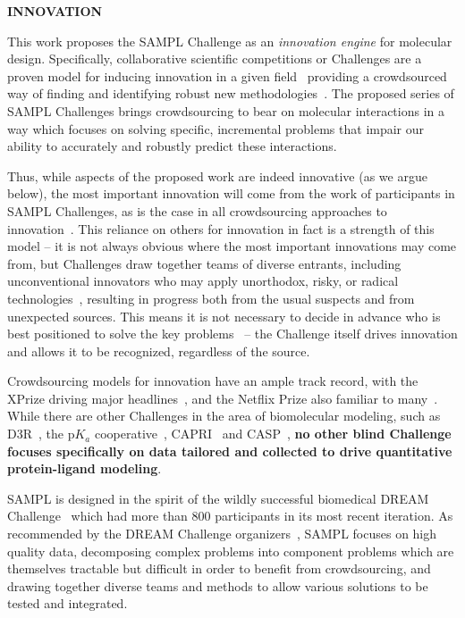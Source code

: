 \documentclass[11pt]{article}
\begin{document}

{\Large \bf INNOVATION}

This work proposes the SAMPL Challenge as an \emph{innovation engine} for molecular design.
Specifically, collaborative scientific competitions or Challenges are a proven model for inducing innovation in a given field~\cite{Saez-Rodriguez:2016:NatRevGenet, Kay:2011:R&DManage, Eisenstein:2013:NatBiotech} providing a crowdsourced way of finding and identifying robust new methodologies~\cite{Saez-Rodriguez:2016:NatRevGenet}. 
The proposed series of SAMPL Challenges brings crowdsourcing to bear on molecular interactions in a way which focuses on solving specific, incremental problems that impair our ability to accurately and robustly predict these interactions.

Thus, while aspects of the proposed work are indeed innovative (as we argue below), the most important innovation will come from the work of participants in SAMPL Challenges, as is the case in all crowdsourcing approaches to innovation~\cite{Saez-Rodriguez:2016:NatRevGenet, Kay:2011:R&DManage}.
This reliance on others for innovation in fact is a strength of this model -- it is not always obvious where the most important innovations may come from, but Challenges draw together teams of diverse entrants, including unconventional innovators who may apply unorthodox, risky, or radical technologies~\cite{Kay:2011:R&DManage, Saez-Rodriguez:2016:NatRevGenet,}, resulting in progress both from the usual suspects and from unexpected sources.
This means it is not necessary to decide in advance who is best positioned to solve the key problems~\cite{Saez-Rodriguez:2016:NatRevGenet,} -- the Challenge itself drives innovation and allows it to be recognized, regardless of the source.

Crowdsourcing models for innovation have an ample track record, with the XPrize driving major headlines~\cite{::XPRIZE, Kay:2011:R&DManage, XPrize:2017:Wikipedia}, and the Netflix Prize also familiar to many~\cite{Bell:2010:CHANCE}. 
While there are other Challenges in the area of biomolecular modeling, such as D3R~\cite{Gathiaka:2016:JComputAidedMolDes}, the p$K_a$ cooperative~\cite{Nielsen:2011:Proteins}, CAPRI~\cite{Janin:2005:ProteinScience} and CASP~\cite{Moult:2014:Proteins},
\textbf{no other blind Challenge focuses specifically on data tailored and collected to drive quantitative protein-ligand modeling}.

SAMPL is designed in the spirit of the wildly successful biomedical DREAM Challenge~\cite{Prill:2011:Sci.Signal., Eisenstein:2013:NatBiotech, Saez-Rodriguez:2016:NatRevGenet} which had more than 800 participants in its most recent iteration. 
As recommended by the DREAM Challenge organizers~\cite{Saez-Rodriguez:2016:NatRevGenet}, SAMPL focuses on high quality data, decomposing complex problems into component problems which are themselves tractable but difficult in order to benefit from crowdsourcing, and drawing together diverse teams and methods to allow various solutions to be tested and integrated.
\end{document}
